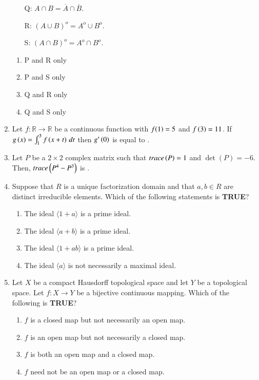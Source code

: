 \documentclass[journal]{IEEEtran}
\begin{document}
\begin{enumerate}
\begin{itemize}
    \item[Q:]$ A \cap B = \overline{A} \cap \overline{B} $.
    \item[R:]$ (A \cup B)^o = A^o \cup B^o $.
    \item[S:]$ (A \cap B)^o = A^o \cap B^o $.
\end{itemize}
\begin{multicols}{4}
\begin{enumerate}
    \item P and R only
    \item P and S only
    \item Q and R only
    \item Q and S only
\end{enumerate}
\end{multicols}
\item Let $ f : \mathbb{R} \to \mathbb{R} $ be a continuous function with $ f{\left(1\right)} = 5 $ and $ f\left(3\right) = 11 $. If $ g\left(x\right) = \int_1^3 f\left(x + t\right) \, dt $ then $ g^{\prime}\left(0\right) $ is equal to \underline{\hspace{2cm}}.
\\
\item  Let  $P$  be a $ 2 \times 2 $ complex matrix such that $ trace\left(P\right) = 1 $ and $ \det(P) = -6 $. Then, $ trace\left(P^{4} - P^{3}\right) $ is \underline{\hspace{2cm}}.
\\
\item  Suppose that  $R$  is a unique factorization domain and that $ a, b \in R $ are distinct irreducible elements. Which of the following statements is \textbf{TRUE}?
\begin{enumerate}
    \item The ideal \( \langle 1 + a \rangle \) is a prime ideal.
    \item The ideal \( \langle a + b \rangle \) is a prime ideal.
    \item The ideal \( \langle 1 + ab \rangle \) is a prime ideal.
    \item The ideal \( \langle a \rangle \) is not necessarily a maximal ideal.
\end{enumerate}

\item  Let  $X$  be a compact Hausdorff topological space and let  $Y$  be a topological space. Let $ f : X \to Y $ be a bijective continuous mapping. Which of the following is \textbf{TRUE}?
\begin{enumerate}
    \item $f$ is a closed map but not necessarily an open map.
    \item $f$ is an open map but not necessarily a closed map.
    \item $f$ is both an open map and a closed map.
    \item $f$ need not be an open map or a closed map.
\end{enumerate}


\end{enumerate}
\end{document}
